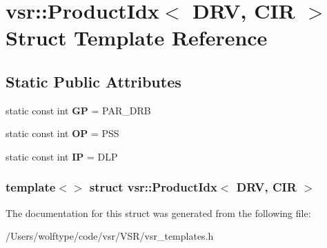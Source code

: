 \hypertarget{structvsr_1_1_product_idx_3_01_d_r_v_00_01_c_i_r_01_4}{\section{vsr\-:\-:Product\-Idx$<$ D\-R\-V, C\-I\-R $>$ Struct Template Reference}
\label{structvsr_1_1_product_idx_3_01_d_r_v_00_01_c_i_r_01_4}
}
\subsection*{Static Public Attributes}
\begin{DoxyCompactItemize}
\item 
\hypertarget{structvsr_1_1_product_idx_3_01_d_r_v_00_01_c_i_r_01_4_a989d5dcfffca879b68794b19ea15a168}{static const int {\bfseries G\-P} = P\-A\-R\-\_\-\-D\-R\-B}\label{structvsr_1_1_product_idx_3_01_d_r_v_00_01_c_i_r_01_4_a989d5dcfffca879b68794b19ea15a168}

\item 
\hypertarget{structvsr_1_1_product_idx_3_01_d_r_v_00_01_c_i_r_01_4_abc8acb78144b909a6ab3877683148836}{static const int {\bfseries O\-P} = P\-S\-S}\label{structvsr_1_1_product_idx_3_01_d_r_v_00_01_c_i_r_01_4_abc8acb78144b909a6ab3877683148836}

\item 
\hypertarget{structvsr_1_1_product_idx_3_01_d_r_v_00_01_c_i_r_01_4_a58917b93898bcdfc8de83fdcd1590df5}{static const int {\bfseries I\-P} = D\-L\-P}\label{structvsr_1_1_product_idx_3_01_d_r_v_00_01_c_i_r_01_4_a58917b93898bcdfc8de83fdcd1590df5}

\end{DoxyCompactItemize}
\subsubsection*{template$<$$>$ struct vsr\-::\-Product\-Idx$<$ D\-R\-V, C\-I\-R $>$}



The documentation for this struct was generated from the following file\-:\begin{DoxyCompactItemize}
\item 
/\-Users/wolftype/code/vsr/\-V\-S\-R/vsr\-\_\-templates.\-h\end{DoxyCompactItemize}
